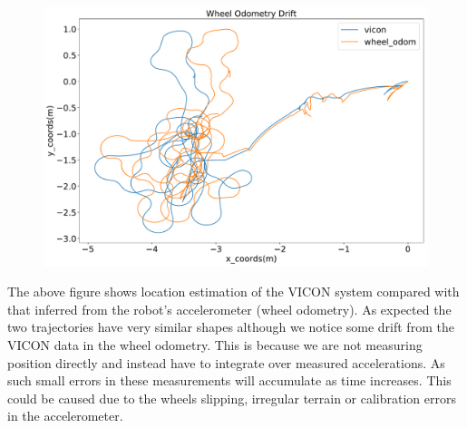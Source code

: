 \documentclass{article}
\begin{document}
  \begin{figure}[H]
    \centering
    \includegraphics[width=\textwidth]{../figures/wheelodom2d.pdf}
  \end{figure}

  The above figure shows location estimation of the VICON system compared with that inferred from the robot's accelerometer (wheel odometry). As expected the two trajectories have very similar shapes although we notice some drift from the VICON data in the wheel odometry. This is because we are not measuring position directly and instead have to integrate over measured accelerations. As such small errors in these measurements will accumulate as time increases. This could be caused due to the wheels slipping, irregular terrain or calibration errors in the accelerometer.%
\end{document}

